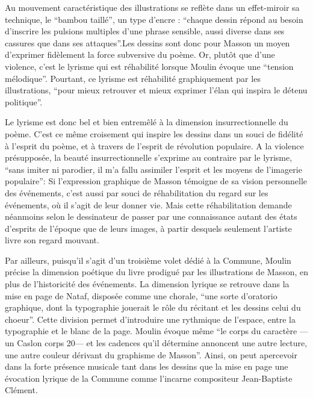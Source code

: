 	Au mouvement caractéristique des illustrations se reflète dans un effet-miroir sa technique, le \enquote{bambou taillé}, un type d’encre : \enquote{chaque dessin répond au besoin d’inscrire les pulsions multiples d’une phrase sensible, aussi diverse dans ses cassures que dans ses attaques}.Les dessins sont donc pour Masson un moyen d’exprimer fidèlement la force subversive du poème. Or, plutôt que d’une violence, c’est le lyrisme qui est réhabilité lorsque Moulin évoque une \enquote{tension mélodique}. Pourtant, ce lyrisme est réhabilité graphiquement par les illustrations, \enquote{pour mieux retrouver et mieux exprimer l’élan qui inspira le détenu politique}. 

Le lyrisme est donc bel et bien entremêlé à la dimension insurrectionnelle du poème. C’est ce même croisement qui inspire les dessins dans un souci de fidélité à l’esprit du poème, et à travers de l’esprit de révolution populaire. A la violence présupposée, la beauté insurrectionnelle s’exprime au contraire par le lyrisme, \enquote{sans imiter ni parodier, il m’a fallu assimiler l’esprit et les moyens de l’imagerie populaire}: Si l’expression graphique de Masson témoigne de sa vision personnelle des événements, c’est aussi par souci de réhabilitation du regard sur les événements, où il s’agit de leur donner vie. Mais cette réhabilitation demande néanmoins selon le dessinateur de passer par une connaissance autant des états d’esprits de l’époque que de leurs images, à partir desquels seulement l’artiste livre son regard mouvant. 


Par ailleurs, puisqu’il s’agit d’un troisième volet dédié à la Commune, Moulin précise la dimension poétique du livre prodigué par les illustrations de Masson, en plus de l’historicité des événements. La dimension lyrique se retrouve dans la mise en page de Nataf, disposée comme une chorale, \enquote{une sorte d’oratorio graphique, dont la typographie jouerait le rôle du récitant et les dessins celui du choeur}. Cette division permet d’introduire une rythmique de l’espace, entre la typographie et le blanc de la page. Moulin évoque même \enquote{le corps du caractère — un Caslon corps 20— et les cadences qu’il détermine annoncent une autre lecture, une autre couleur dérivant du graphisme de Masson}. Ainsi, on peut apercevoir dans la forte présence musicale tant dans les dessins que la mise en page une évocation lyrique de la Commune comme l’incarne compositeur Jean-Baptiste Clément. 

